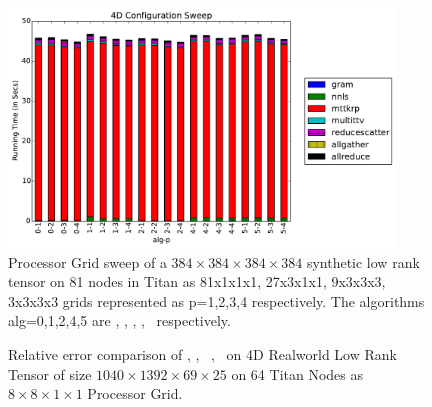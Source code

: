 \begin{figure}
\includegraphics[width=\textwidth, height=2.5in]{data/plots/confsweep4d.pdf}
\caption{Processor Grid sweep of a $384 \times 384 \times 384 \times 384$ synthetic low rank tensor on 81 nodes in Titan as 81x1x1x1, 27x3x1x1, 9x3x3x3, 3x3x3x3 grids represented as p=1,2,3,4 respectively. The algorithms alg=0,1,2,4,5 are \MU, \HALS, \BPP, \ADMM, \Nestrov\ respectively.}
\label{fig:confsweep4D}
\end{figure}

\begin{figure}
	\caption{Relative error comparison of \MU, \HALS, \BPP\, \ADMM, \Nestrov\ on 4D Realworld Low Rank Tensor of size $1040\times1392\times69\times25$ on 64 Titan Nodes as $8\times8\times1\times1$ Processor Grid.}
	\label{fig:convergencemouse}
\end{figure}


